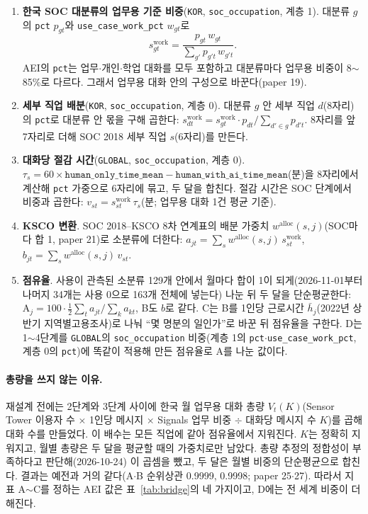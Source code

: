 \documentclass[11pt]{article}
\begin{document}
\begin{enumerate}[leftmargin=*]
  \item \textbf{한국 SOC 대분류의 업무용 기준 비중}(\texttt{KOR}, \texttt{soc\_occupation}, 계층 1). 대분류 $g$의 \texttt{pct} $p_{gt}$와 \texttt{use\_case\_work\_pct} $w_{gt}$로
  \[ s^{\text{work}}_{gt} = \frac{p_{gt}\,w_{gt}}{\sum_{g'} p_{g't}\,w_{g't}}. \]
  AEI의 \texttt{pct}는 업무$\cdot$개인$\cdot$학업 대화를 모두 포함하고 대분류마다 업무용 비중이 8$\sim$85\%로 다르다. 그래서 업무용 대화 안의 구성으로 바꾼다(paper 19).
  \item \textbf{세부 직업 배분}(\texttt{KOR}, \texttt{soc\_occupation}, 계층 0). 대분류 $g$ 안 세부 직업 $d$(8자리)의 \texttt{pct}로 대분류 안 몫을 구해 곱한다: $s^{\text{work}}_{dt} = s^{\text{work}}_{gt} \cdot p_{dt} / \sum_{d' \in g} p_{d't}$. 8자리를 앞 7자리로 더해 SOC 2018 세부 직업 $s$(6자리)를 만든다.
  \item \textbf{대화당 절감 시간}(\texttt{GLOBAL}, \texttt{soc\_occupation}, 계층 0). $\tau_s = 60 \times \texttt{human\_only\_time\_mean} - \texttt{human\_with\_ai\_time\_mean}$(분)을 8자리에서 계산해 \texttt{pct} 가중으로 6자리에 묶고, 두 달을 합친다. 절감 시간은 SOC 단계에서 비중과 곱한다: $v_{st} = s^{\text{work}}_{st}\,\tau_s$(분; 업무용 대화 1건 평균 기준).
  \item \textbf{KSCO 변환}. SOC 2018--KSCO 8차 연계표의 배분 가중치 $w^{\text{alloc}}(s, j)$(SOC마다 합 1, paper 21)로 소분류에 더한다: $a_{jt} = \sum_s w^{\text{alloc}}(s,j)\,s^{\text{work}}_{st}$, $b_{jt} = \sum_s w^{\text{alloc}}(s,j)\,v_{st}$.
  \item \textbf{점유율}. 사용이 관측된 소분류 129개 안에서 월마다 합이 1이 되게(2026-11-01부터 나머지 34개는 사용 0으로 163개 전체에 넣는다) 나눈 뒤 두 달을 단순평균한다: $\text{A}_j = 100 \cdot \tfrac12 \sum_t a_{jt}/\sum_k a_{kt}$, B도 $b$로 같다. C는 B를 1인당 근로시간 $\bar h_j$(2022년 상반기 지역별고용조사)로 나눠 ``몇 명분의 일인가''로 바꾼 뒤 점유율을 구한다. D는 1$\sim$4단계를 \texttt{GLOBAL}의 \texttt{soc\_occupation} 비중(계층 1의 \texttt{pct}$\cdot$\texttt{use\_case\_work\_pct}, 계층 0의 \texttt{pct})에 똑같이 적용해 만든 점유율로 A를 나눈 값이다.
\end{enumerate}

\paragraph{총량을 쓰지 않는 이유.} 재설계 전에는 2단계와 3단계 사이에 한국 월 업무용 대화 총량 $V_t(K)$(Sensor Tower 이용자 수 $\times$ 1인당 메시지 $\times$ Signals 업무 비중 $\div$ 대화당 메시지 수 $K$)를 곱해 대화 수를 만들었다. 이 배수는 모든 직업에 같아 점유율에서 지워진다. $K$는 정확히 지워지고, 월별 총량은 두 달을 평균할 때의 가중치로만 남았다. 총량 추정의 정합성이 부족하다고 판단해(2026-10-24) 이 곱셈을 뺐고, 두 달은 월별 비중의 단순평균으로 합친다. 결과는 예전과 거의 같다(A$\cdot$B 순위상관 0.9999, 0.9998; paper 25$\cdot$27). 따라서 지표 A$\sim$C를 정하는 AEI 값은 표~\ref{tab:bridge}의 네 가지이고, D에는 전 세계 비중이 더해진다.
\end{document}
